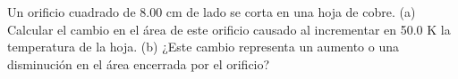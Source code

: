 \item Un orificio cuadrado de 8.00 cm de lado se corta en una hoja de cobre. (a) Calcular el cambio en el área de este orificio causado al incrementar en 50.0 K la temperatura de la hoja. (b) ¿Este cambio representa un aumento o una disminución en el área encerrada por el orificio?
